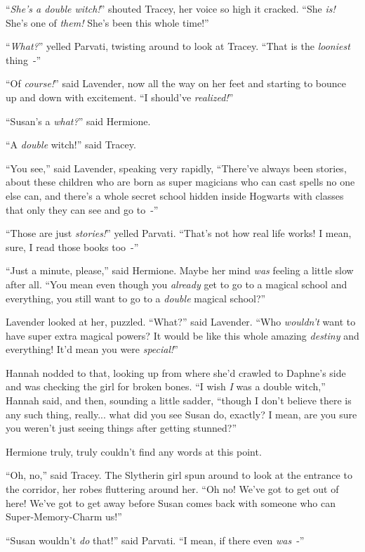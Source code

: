``\emph{She's a double witch!}'' shouted Tracey, her voice so high it cracked. ``She \emph{is!} She's one of \emph{them!} She's been this whole time!''

``\emph{What?}'' yelled Parvati, twisting around to look at Tracey. ``That is the \emph{looniest} thing~-''

``Of \emph{course!}'' said Lavender, now all the way on her feet and starting to bounce up and down with excitement. ``I should've \emph{realized!}''

``Susan's a \emph{what?}'' said Hermione.

``A \emph{double} witch!'' said Tracey.

``You see,'' said Lavender, speaking very rapidly, ``There've always been stories, about these children who are born as super magicians who can cast spells no one else can, and there's a whole secret school hidden inside Hogwarts with classes that only they can see and go to~-''

``Those are just \emph{stories!}'' yelled Parvati. ``That's not how real life works! I mean, sure, I read those books too~-''

``Just a minute, please,'' said Hermione. Maybe her mind \emph{was} feeling a little slow after all. ``You mean even though you \emph{already} get to go to a magical school and everything, you still want to go to a \emph{double} magical school?''

Lavender looked at her, puzzled. ``What?'' said Lavender. ``Who \emph{wouldn't} want to have super extra magical powers? It would be like this whole amazing \emph{destiny} and everything! It'd mean you were \emph{special!}''

Hannah nodded to that, looking up from where she'd crawled to Daphne's side and was checking the girl for broken bones. ``I wish \emph{I} was a double witch,'' Hannah said, and then, sounding a little sadder, ``though I don't believe there is any such thing, really... what did you see Susan do, exactly? I mean, are you sure you weren't just seeing things after getting stunned?''

Hermione truly, truly couldn't find any words at this point.

``Oh, no,'' said Tracey. The Slytherin girl spun around to look at the entrance to the corridor, her robes fluttering around her. ``Oh no! We've got to get out of here! We've got to get away before Susan comes back with someone who can Super-Memory-Charm us!''

``Susan wouldn't \emph{do} that!'' said Parvati. ``I mean, if there even \emph{was}~-''

